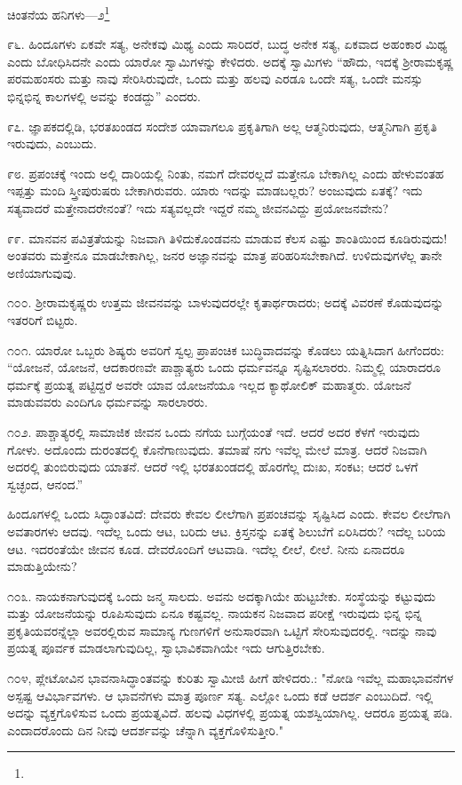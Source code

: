 ಚಿಂತನೆಯ ಹನಿಗಳು—೨\protect\footnote{}

೯೬. ಹಿಂದೂಗಳು ಏಕವೇ ಸತ್ಯ, ಅನೇಕವು ಮಿಥ್ಯ ಎಂದು ಸಾರಿದರೆ, ಬುದ್ಧ ಅನೇಕ ಸತ್ಯ, ಏಕವಾದ ಅಹಂಕಾರ ಮಿಥ್ಯ ಎಂದು ಬೋಧಿಸಿದನೇ ಎಂದು ಯಾರೋ ಸ್ವಾಮಿಗಳನ್ನು ಕೇಳಿದರು. ಅದಕ್ಕೆ ಸ್ವಾಮಿಗಳು “ಹೌದು, ಇದಕ್ಕೆ ಶ‍್ರೀರಾಮಕೃಷ್ಣ ಪರಮಹಂಸರು ಮತ್ತು ನಾವು ಸೇರಿಸಿರುವುದೇ, ಒಂದು ಮತ್ತು ಹಲವು ಎರಡೂ ಒಂದೇ ಸತ್ಯ, ಒಂದೇ ಮನಸ್ಸು ಭಿನ್ನಭಿನ್ನ ಕಾಲಗಳಲ್ಲಿ ಅವನ್ನು ಕಂಡದ್ದು” ಎಂದರು.

೯೭. ಜ್ಞಾಪಕದಲ್ಲಿಡಿ, ಭರತಖಂಡದ ಸಂದೇಶ ಯಾವಾಗಲೂ ಪ್ರಕೃತಿಗಾಗಿ ಅಲ್ಲ ಆತ್ಮನಿರುವುದು, ಆತ್ಮನಿಗಾಗಿ ಪ್ರಕೃತಿ ಇರುವುದು, ಎಂಬುದು.

೯೮. ಪ್ರಪಂಚಕ್ಕೆ ಇಂದು ಅಲ್ಲಿ ದಾರಿಯಲ್ಲಿ ನಿಂತು, ನಮಗೆ ದೇವರಲ್ಲದೆ ಮತ್ತೇನೂ ಬೇಕಾಗಿಲ್ಲ ಎಂದು ಹೇಳುವಂತಹ ಇಪ್ಪತ್ತು ಮಂದಿ ಸ್ತ್ರೀಪುರುಷರು ಬೇಕಾಗಿರುವರು. ಯಾರು ಇದನ್ನು ಮಾಡಬಲ್ಲರು? ಅಂಜುವುದು ಏತಕ್ಕೆ? ಇದು ಸತ್ಯವಾದರೆ ಮತ್ತೇನಾದರೇನಂತೆ? ಇದು ಸತ್ಯವಲ್ಲದೇ ಇದ್ದರೆ ನಮ್ಮ ಜೀವನವಿದ್ದು ಪ್ರಯೋಜನವೇನು?

೯೯. ಮಾನವನ ಪವಿತ್ರತೆಯನ್ನು ನಿಜವಾಗಿ ತಿಳಿದುಕೊಂಡವನು ಮಾಡುವ ಕೆಲಸ ಎಷ್ಟು ಶಾಂತಿಯಿಂದ ಕೂಡಿರುವುದು! ಅಂತವರು ಮತ್ತೇನೂ ಮಾಡಬೇಕಾಗಿಲ್ಲ, ಜನರ ಅಜ್ಞಾನವನ್ನು ಮಾತ್ರ ಪರಿಹರಿಸಬೇಕಾಗಿದೆ. ಉಳಿದುವುಗಳೆಲ್ಲ ತಾನೇ ಅಣಿಯಾಗುವುವು.

೧೦೦. ಶ‍್ರೀರಾಮಕೃಷ್ಣರು ಉತ್ತಮ ಜೀವನವನ್ನು ಬಾಳುವುದರಲ್ಲೇ ಕೃತಾರ್ಥರಾದರು; ಅದಕ್ಕೆ ವಿವರಣೆ ಕೊಡುವುದನ್ನು ಇತರರಿಗೆ ಬಿಟ್ಟರು.

೧೦೧. ಯಾರೋ ಒಬ್ಬರು ಶಿಷ್ಯರು ಅವರಿಗೆ ಸ್ವಲ್ಪ ಪ್ರಾಪಂಚಿಕ ಬುದ್ಧಿವಾದವನ್ನು ಕೊಡಲು ಯತ್ನಿಸಿದಾಗ ಹೀಗೆಂದರು: “ಯೋಜನೆ, ಯೋಜನೆ, ಆದಕಾರಣವೇ ಪಾಶ್ಚಾತ್ಯರು ಒಂದು ಧರ್ಮವನ್ನೂ ಸೃಷ್ಟಿಸಲಾರರು. ನಿಮ್ಮಲ್ಲಿ ಯಾರಾದರೂ ಧರ್ಮಕ್ಕೆ ಪ್ರಯತ್ನ ಪಟ್ಟಿದ್ದರೆ ಅವರೇ ಯಾವ ಯೋಜನೆಯೂ ಇಲ್ಲದ ಕ್ಯಾಥೋಲಿಕ್ ಮಹಾತ್ಮರು. ಯೋಜನೆ ಮಾಡುವವರು ಎಂದಿಗೂ ಧರ್ಮವನ್ನು ಸಾರಲಾರರು.

೧೦೨. ಪಾಶ್ಚಾತ್ಯರಲ್ಲಿ ಸಾಮಾಜಿಕ ಜೀವನ ಒಂದು ನಗೆಯ ಬುಗ್ಗೆಯಂತೆ ಇದೆ. ಆದರೆ ಅದರ ಕೆಳಗೆ ಇರುವುದು ಗೋಳು. ಅದೊಂದು ದುರಂತದಲ್ಲಿ ಕೊನೆಗಾಣುವುದು. ತಮಾಷೆ ನಗು ಇವೆಲ್ಲ ಮೇಲೆ ಮಾತ್ರ. ಆದರೆ ನಿಜವಾಗಿ ಅದರಲ್ಲಿ ತುಂಬಿರುವುದು ಯಾತನೆ. ಆದರೆ ಇಲ್ಲಿ ಭರತಖಂಡದಲ್ಲಿ ಹೊರಗೆಲ್ಲ ದುಃಖ, ಸಂಕಟ; ಆದರೆ ಒಳಗೆ ಸ್ವಚ್ಛಂದ, ಆನಂದ.”

ಹಿಂದೂಗಳಲ್ಲಿ ಒಂದು ಸಿದ್ಧಾಂತವಿದೆ: ದೇವರು ಕೇವಲ ಲೀಲೆಗಾಗಿ ಪ್ರಪಂಚವನ್ನು ಸೃಷ್ಟಿಸಿದ ಎಂದು. ಕೇವಲ ಲೀಲೆಗಾಗಿ ಅವತಾರಗಳು ಆದವು. ಇದೆಲ್ಲ ಒಂದು ಆಟ, ಬರಿದು ಆಟ. ಕ್ರಿಸ್ತನನ್ನು ಏತಕ್ಕೆ ಶಿಲುಬೆಗೆ ಏರಿಸಿದರು? ಇದೆಲ್ಲ ಬರಿಯ ಆಟ. ಇದರಂತೆಯೇ ಜೀವನ ಕೂಡ. ದೇವರೊಂದಿಗೆ ಆಟವಾಡಿ. ಇದೆಲ್ಲ ಲೀಲೆ, ಲೀಲೆ. ನೀನು ಏನಾದರೂ ಮಾಡುತ್ತಿಯೇನು?

೧೦೩. ನಾಯಕನಾಗುವುದಕ್ಕೆ ಒಂದು ಜನ್ಮ ಸಾಲದು. ಅವನು ಅದಕ್ಕಾಗಿಯೇ ಹುಟ್ಟಬೇಕು. ಸಂಸ್ಥೆಯನ್ನು ಕಟ್ಟುವುದು ಮತ್ತು ಯೋಜನೆಯನ್ನು ರೂಪಿಸುವುದು ಏನೂ ಕಷ್ಟವಲ್ಲ. ನಾಯಕನ ನಿಜವಾದ ಪರೀಕ್ಷೆ ಇರುವುದು ಭಿನ್ನ ಭಿನ್ನ ಪ್ರಕೃತಿಯವರನ್ನೆಲ್ಲಾ ಅವರಲ್ಲಿರುವ ಸಾಮಾನ್ಯ ಗುಣಗಳಿಗೆ ಅನುಸಾರವಾಗಿ ಒಟ್ಟಿಗೆ ಸೇರಿಸುವುದರಲ್ಲಿ. ಇದನ್ನು ನಾವು ಪ್ರಯತ್ನ ಪೂರ್ವಕ ಮಾಡಲಾಗುವುದಿಲ್ಲ, ಸ್ವಾಭಾವಿಕವಾಗಿಯೇ ಇದು ಆಗುತ್ತಿರಬೇಕು.

೧೦೪, ಪ್ಲೇಟೋವಿನ ಭಾವನಾಸಿದ್ಧಾಂತವನ್ನು  ಕುರಿತು ಸ್ವಾಮೀಜಿ ಹೀಗೆ ಹೇಳಿದರು.: "ನೋಡಿ ಇವೆಲ್ಲ ಮಹಾಭಾವನೆಗಳ ಅಸ್ಪಷ್ಟ ಆವಿರ್ಭಾವಗಳು. ಆ ಭಾವನೆಗಳು ಮಾತ್ರ ಪೂರ್ಣ ಸತ್ಯ. ಎಲ್ಲೋ ಒಂದು ಕಡೆ ಆದರ್ಶ ಎಂಬುದಿದೆ. ಇಲ್ಲಿ ಅದನ್ನು ವ್ಯಕ್ತಗೊಳಿಸುವ ಒಂದು ಪ್ರಯತ್ನವಿದೆ. ಹಲವು ವಿಧಗಳಲ್ಲಿ ಪ್ರಯತ್ನ ಯಶಸ್ವಿಯಾಗಿಲ್ಲ. ಆದರೂ ಪ್ರಯತ್ನ ಪಡಿ. ಎಂದಾದರೊಂದು ದಿನ ನೀವು ಆದರ್ಶವನ್ನು ಚೆನ್ನಾಗಿ ವ್ಯಕ್ತಗೊಳಿಸುತ್ತೀರಿ."

